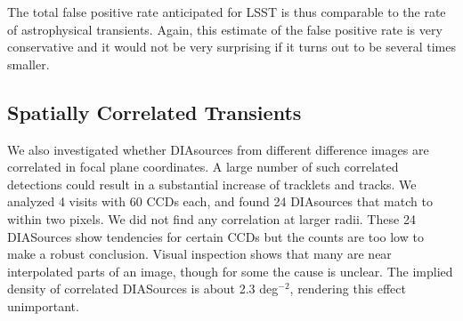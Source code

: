 The total false positive rate anticipated for LSST is thus comparable to the rate of 
astrophysical transients. Again, this estimate of the false positive rate is very conservative
and it would not be very surprising if it turns out to be several times smaller. 



\subsection{Spatially Correlated Transients} 


We also investigated whether DIAsources from different difference images are correlated 
in focal plane coordinates. A large number of such correlated detections could result in
a substantial increase of tracklets and tracks. We analyzed 4 visits with 60 CCDs each, 
and found 24 DIAsources that match to within two pixels. We did not find any correlation at 
larger radii. These 24 DIASources show tendencies for certain CCDs but the counts are too 
low to make a robust conclusion. Visual inspection shows that many are near interpolated 
parts of an image, though for some the cause is unclear.  The implied density of correlated 
DIASources is about 2.3 deg$^{-2}$, rendering this effect unimportant. 

